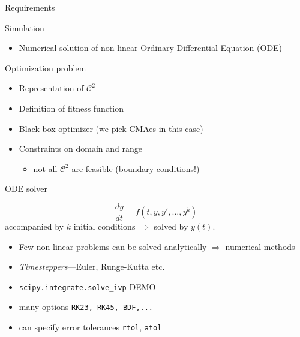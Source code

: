 \documentclass[presentation]{beamer}
\begin{document}
\begin{frame}[label={sec:orgc30aea7}]{Requirements}
\begin{alertblock}{Simulation}
\begin{itemize}
\item \alert{Numerical solution} of non-linear Ordinary Differential Equation (ODE)
\end{itemize}
\end{alertblock}
\begin{alertblock}{Optimization problem}
\begin{itemize}
\item \alert{Representation} of \(\mathcal{C}^2\)
\item Definition of \alert{fitness function}
\item Black-box \alert{optimizer} (we pick CMAes in this case)
\item \alert{Constraints} on domain and range
\begin{itemize}
\item not all \(\mathcal{C}^2\) are feasible (boundary conditions!)
\end{itemize}
\end{itemize}
\end{alertblock}
\end{frame}
\begin{frame}[label={sec:orgdb33c1c},fragile]{ODE solver}
 \begin{definition}
\[ \frac{dy}{dt} = f(t, y, y', \dots, y^{k})\]
accompanied by \(k\) initial conditions \(\Rightarrow\) solved by \(y(t)\).
\begin{itemize}
\item Few non-linear problems can be solved analytically \(\Rightarrow\) \alert{numerical methods}
\item \emph{Timesteppers}---Euler, Runge-Kutta etc.
\end{itemize}
\end{definition}
\begin{example}
\begin{itemize}
\item \texttt{scipy.integrate.solve\_ivp} \alert{DEMO}
\item many options \texttt{RK23, RK45, BDF,...}
\item can specify error tolerances \texttt{rtol}, \texttt{atol}
\end{itemize}
\end{example}
\end{frame}
\end{document}
